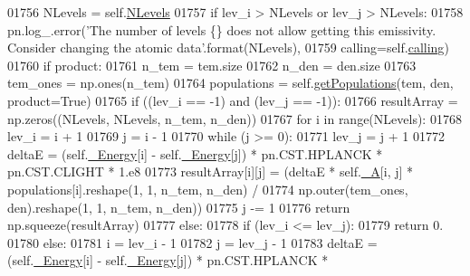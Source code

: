 \begin{DoxyCode}
{{01756         NLevels = self.\hyperlink{classpyneb_1_1core_1_1pynebcore_1_1_atom_a6b43c1e6431a6786c1b4267f704fb4e8}{NLevels}
01757         \textcolor{keywordflow}{if} lev\_i > NLevels \textcolor{keywordflow}{or} lev\_j > NLevels:
01758             pn.log\_.error(\textcolor{stringliteral}{'The number of levels \{\} does not allow getting this emissivity. Consider
       changing the atomic data'}.format(NLevels),
01759                           calling=self.\hyperlink{classpyneb_1_1core_1_1pynebcore_1_1_atom_a373b7735acf4f528b54bddf373ad67a1}{calling}) 
01760         \textcolor{keywordflow}{if} product:
01761             n\_tem = tem.size
01762             n\_den = den.size
01763             tem\_ones = np.ones(n\_tem)
01764             populations = self.\hyperlink{classpyneb_1_1core_1_1pynebcore_1_1_atom_aab7496403c8aaef40ab3b20b5c00e9f0}{getPopulations}(tem, den, product=\textcolor{keyword}{True})
01765             \textcolor{keywordflow}{if} ((lev\_i == -1) \textcolor{keywordflow}{and} (lev\_j == -1)):
01766                 resultArray = np.zeros((NLevels, NLevels, n\_tem, n\_den))
01767                 \textcolor{keywordflow}{for} i \textcolor{keywordflow}{in} range(NLevels):
01768                     lev\_i = i + 1
01769                     j = i - 1 
01770                     \textcolor{keywordflow}{while} (j >= 0):
01771                         lev\_j = j + 1
01772                         deltaE = (self.\hyperlink{classpyneb_1_1core_1_1pynebcore_1_1_atom_a52e68715246d258bf0a14f4bd06e89e4}{\_Energy}[i] - self.\hyperlink{classpyneb_1_1core_1_1pynebcore_1_1_atom_a52e68715246d258bf0a14f4bd06e89e4}{\_Energy}[j]) * pn.CST.HPLANCK * 
      pn.CST.CLIGHT * 1.e8 
01773                         resultArray[i][j] = (deltaE * self.\hyperlink{classpyneb_1_1core_1_1pynebcore_1_1_atom_aa6416fe661b8deaa008179314727e025}{\_A}[i, j] * populations[i].reshape(1, 1, n\_tem,
       n\_den) / 
01774                                              np.outer(tem\_ones, den).reshape(1, 1, n\_tem, n\_den))
01775                         j -= 1
01776                 \textcolor{keywordflow}{return} np.squeeze(resultArray)
01777             \textcolor{keywordflow}{else}:
01778                 \textcolor{keywordflow}{if} (lev\_i <= lev\_j):
01779                     \textcolor{keywordflow}{return} 0.
01780                 \textcolor{keywordflow}{else}:
01781                     i = lev\_i - 1
01782                     j = lev\_j - 1
01783                     deltaE = (self.\hyperlink{classpyneb_1_1core_1_1pynebcore_1_1_atom_a52e68715246d258bf0a14f4bd06e89e4}{\_Energy}[i] - self.\hyperlink{classpyneb_1_1core_1_1pynebcore_1_1_atom_a52e68715246d258bf0a14f4bd06e89e4}{\_Energy}[j]) * pn.CST.HPLANCK * 
}}
\end{DoxyCode}
